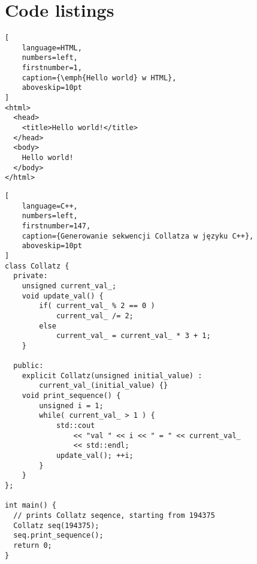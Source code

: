 \newpage %
\section{Code listings}

\lipsum[10]

\begin{addmargin}[6mm]{0mm}
\begin{lstlisting}[
    language=HTML,
    numbers=left,
    firstnumber=1,
    caption={\emph{Hello world} w HTML},
    aboveskip=10pt
]
<html>
  <head>
    <title>Hello world!</title>
  </head>
  <body>
    Hello world!
  </body>
</html>
\end{lstlisting}
\end{addmargin}

\lipsum[11]

\begin{addmargin}[10mm]{0mm}
\begin{lstlisting}[
    language=C++,
    numbers=left,
    firstnumber=147,
    caption={Generowanie sekwencji Collatza w języku C++},
    aboveskip=10pt
]
class Collatz {
  private:
    unsigned current_val_;
    void update_val() {
        if( current_val_ % 2 == 0 )
            current_val_ /= 2;
        else
            current_val_ = current_val_ * 3 + 1;
    }

  public:
    explicit Collatz(unsigned initial_value) : 
        current_val_(initial_value) {}
    void print_sequence() {
        unsigned i = 1;
        while( current_val_ > 1 ) {
            std::cout
                << "val " << i << " = " << current_val_
                << std::endl;
            update_val(); ++i;
        }
    }
};

int main() {
  // prints Collatz seqence, starting from 194375
  Collatz seq(194375);
  seq.print_sequence();
  return 0;
}
\end{lstlisting}
\end{addmargin}

\lipsum[12]
